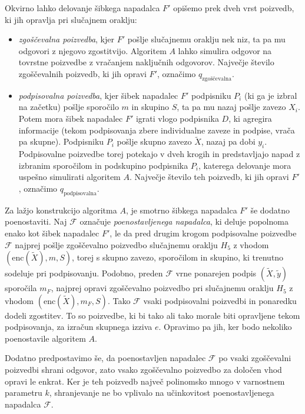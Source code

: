 \begin{dokaz}
Okvirno lahko delovanje šibkega napadalca $F'$ opišemo prek dveh vrst poizvedb, ki jih opravlja pri
slučajnem oraklju:
\begin{itemize}
    \item \textit{zgoščevalna poizvedba}, kjer $F'$ pošlje slučajnemu oraklju nek niz, ta pa mu
        odgovori z njegovo zgostitvijo. Algoritem $A$ lahko simulira odgovor na tovrstne poizvedbe z
        vračanjem naključnih odgovorov. Največje število zgoščevalnih poizvedb, ki jih opravi $F'$,
        označimo $q_{\text{zgoščevalna}}$.
    \item \textit{podpisovalna poizvedba}, kjer šibek napadalec $F'$ podpisniku $P_i$ (ki ga je
        izbral na začetku) pošlje sporočilo $m$ in skupino $S$, ta pa mu nazaj pošlje zavezo $X_i$.
        Potem mora šibek napadalec $F'$ igrati vlogo podpisnika $D$, ki agregira informacije (tekom
        podpisovanja zbere individualne zaveze in podpise, vrača pa skupne). Podpisniku $P_i$ pošlje
        skupno zavezo $\tilde{X}$, nazaj pa dobi $y_i$. Podpisovalne poizvedbe torej potekajo v dveh
        krogih in predstavljajo napad z izbranim sporočilom in podskupino podpisnika $P_i$, katerega
        delovanje mora uspešno simulirati algoritem $A$. Največje število teh poizvedb, ki jih opravi
        $F'$, označimo $q_{\text{podpisovalna}}$.
\end{itemize}

Za lažjo konstrukcijo algoritma $A$, je smotrno šibkega napadalca $F'$ še dodatno poenostaviti. Naj
$\mathcal{F}$ označuje \textit{poenostavljenega napadalca}, ki deluje popolnoma enako kot šibek napadalec
$F'$, le da pred drugim krogom podpisovalne poizvedbe $\mathcal{F}$ najprej pošlje zgoščevalno poizvedbo
slučajnemu oraklju $H_5$ z vhodom $(\text{enc}(\tilde{X}), m, S)$, torej s skupno zavezo, sporočilom in
skupino, ki trenutno sodeluje pri podpisovanju. Podobno, preden $\mathcal{F}$ vrne ponarejen podpis
$(\tilde{X}, \tilde{y})$ sporočila $m_F$, najprej opravi zgoščevalno poizvedbo pri slučajnemu oraklju
$H_5$ z vhodom $(\text{enc}(\tilde{X}), m_F, S)$. Tako $\mathcal{F}$ vsaki podpisovalni poizvedbi in
ponaredku dodeli zgostitev. To so poizvedbe, ki bi tako ali tako morale biti opravljene tekom podpisovanja,
za izračun skupnega izziva $e$. Opravimo pa jih, ker bodo nekoliko poenostavile algoritem $A$.

Dodatno predpostavimo še, da poenostavljen napadalec $\mathcal{F}$ po vsaki zgoščevalni poizvedbi
shrani odgovor, zato vsako zgoščevalno poizvedbo za določen vhod opravi le enkrat. Ker je teh poizvedb
največ polinomsko mnogo v varnostnem parametru $k$, shranjevanje ne bo vplivalo na učinkovitost
poenostavljenega napadalca $\mathcal{F}$.


\end{dokaz}

